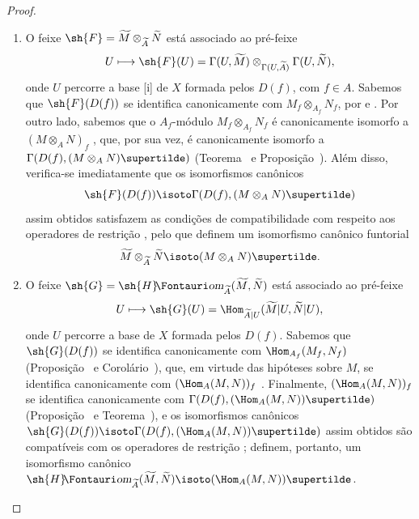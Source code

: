 \documentclass[oneside]{amsart}
\makeatletter
\newcommand{\ega@arrow}[2]{\mathchoice{#1}{#2}{#2}{#2}}
\let\ega@shortmapsto\mapsto
\renewcommand{\mapsto}{\ega@arrow{\longmapsto}{\ega@shortmapsto}}
\newcommand*{\ega@sheafop}[3]{\sh{#1}#2\textup{\kern-2.2pt{\Fontauri\slshape #3}}}
\newcommand*{\shHom}{\ega@sheafop{H}{}{om}}
\newcommand{\oldpage}[2][]{{\marginnote{\normalfont\textbf{#1}~|~#2}}\ignorespaces}
\makeatother
\begin{document}
\begin{proof}
\medskip\noindent
\begin{enumerate}
  \item[(i)] O feixe $\sh{F}=\widetilde{M}\otimes_{\widetilde{A}}\widetilde{N}$ está associado ao pré-feixe
    \[
      U\mapsto\sh{F}(U)=\Gamma(U,\widetilde{M})\otimes_{\Gamma(U,\widetilde{A})}\Gamma(U,\widetilde{N}),
    \]
    onde $U$ percorre a base [i] de $X$ formada pelos $D(f)$, com $f\in A$.
    Sabemos que $\sh{F}(D(f))$ se identifica canonicamente com $M_f\otimes_{A_f}N_f$, por  e .
    Por outro lado, sabemos que o $A_f$-módulo $M_f\otimes_{A_f}N_f$ é canonicamente
    isomorfo a $(M\otimes_A N)_f$ , que, por sua vez, é canonicamente isomorfo a $\Gamma(D(f),(M\otimes_A N)\supertilde)$ (Teorema~ e Proposição~).
    Além disso, verifica-se imediatamente que os isomorfismos canônicos
    \[
      \sh{F}(D(f))\isoto\Gamma(D(f),(M\otimes_A N)\supertilde)
    \]
\oldpage[I]{89}
    assim obtidos satisfazem as condições de compatibilidade com respeito aos operadores de restrição , pelo que definem um isomorfismo canônico funtorial
    \[
      \widetilde{M}\otimes_{\widetilde{A}}\widetilde{N}\isoto(M\otimes_A N)\supertilde.
    \]
  \item[(ii)] O feixe $\sh{G}=\shHom_{\widetilde{A}}(\widetilde{M},\widetilde{N})$ está associado ao pré-feixe
    \[
      U\mapsto\sh{G}(U)=\Hom_{\widetilde{A}|U}(\widetilde{M}|U,\widetilde{N}|U),
    \]
    onde $U$ percorre a base de $X$ formada pelos $D(f)$.
    Sabemos que $\sh{G}(D(f))$ se identifica canonicamente com $\Hom_{A_f}(M_f,N_f)$ (Proposição~ e
    Corolário~), que, em virtude das hipóteses sobre $M$, se identifica canonicamente com $(\Hom_A(M,N))_f$ .
    Finalmente, $(\Hom_A(M,N))_f$ se identifica canonicamente com $\Gamma(D(f),(\Hom_A(M,N))\supertilde)$ (Proposição~ e Teorema~), e os isomorfismos canônicos $\sh{G}(D(f))\isoto\Gamma(D(f),(\Hom_A(M,N))\supertilde)$ assim obtidos são compatíveis com os operadores de restrição ;
    definem, portanto, um isomorfismo canônico $\shHom_{\widetilde{A}}(\widetilde{M},\widetilde{N})\isoto(\Hom_A(M,N))\supertilde$.
\end{enumerate}
\end{proof}
\end{document}
